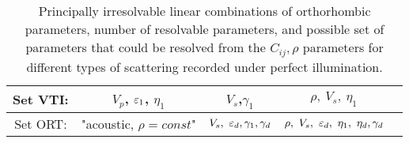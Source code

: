 \begin{table}
\begin{tabular}{|c|c | c | c | c}
		Set VTI: &                       $V_p$, $\varepsilon_1$, $\eta_1$                        & $V_s$,$\gamma_1$                                 & $\rho,~V_s,~\eta_1$                          &  \\ \hline
		Set ORT: &                       "acoustic, $\rho =const$"                        & $V_s,~\varepsilon_d,\gamma_1,\gamma_d$                  & $\rho,~V_s,~\varepsilon_d,~\eta_1,~\eta_d,\gamma_d$ &  \\ \hline
	\end{tabular}
\caption{Principally irresolvable linear combinations of orthorhombic parameters, number of resolvable parameters, and possible set of parameters that 
	could be resolved from the $C_{ij}, \rho$ parameters for different types of scattering recorded under perfect illumination.}
\end{table}